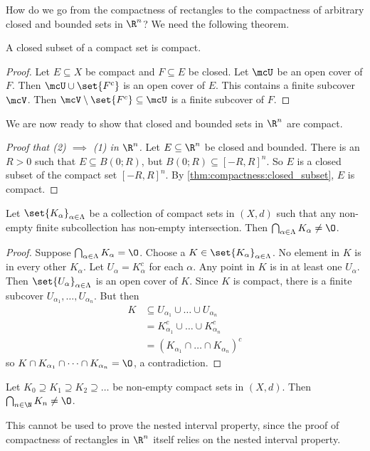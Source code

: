 
How do we go from the compactness of rectangles to the compactness of
arbitrary closed and bounded sets in $\R^n$?
We need the following theorem.
\begin{theorem} \label{thm:compactness:closed_subset}
    A closed subset of a compact set is compact.
\end{theorem}
\begin{proof}
    Let $E \subseteq X$ be compact and $F \subseteq E$ be closed.
    Let $\mcU$ be an open cover of $F$.
    Then $\mcU \cup \set{F^c}$ is an open cover of $E$.
    This contains a finite subcover $\mcV$.
    Then $\mcV \setminus \set{F^c} \subseteq \mcU$ is a finite subcover of $F$.
\end{proof}

We are now ready to show that closed and bounded sets in $\R^n$ are compact.
\begin{proof}[Proof that (2) $\implies$ (1) in $\R^n$]
    Let $E \subseteq \R^n$ be closed and bounded.
    There is an $R > 0$ such that $E \subseteq B(0; R)$, but
    $B(0; R) \subseteq [-R, R]^n$.
    So $E$ is a closed subset of the compact set $[-R, R]^n$.
    By \cref{thm:compactness:closed_subset}, $E$ is compact.
\end{proof}

\begin{theorem} \label{thm:compact:intersection}
    Let $\set{K_\alpha}_{\alpha \in \Lambda}$ be a collection of compact
    sets in $(X, d)$ such that any non-empty finite subcollection has
    non-empty intersection.
    Then $\bigcap_{\alpha \in \Lambda} K_\alpha \neq \O$.
\end{theorem}
\begin{proof}
    Suppose $\bigcap_{\alpha \in \Lambda} K_\alpha = \O$.
    Choose a $K \in \set{K_\alpha}_{\alpha \in \Lambda}$.
    No element in $K$ is in every other $K_\alpha$.
    Let $U_\alpha = K_\alpha^c$ for each $\alpha$.
    Any point in $K$ is in at least one $U_\alpha$.
    Then $\set{U_\alpha}_{\alpha \in \Lambda}$ is an open cover of $K$.
    Since $K$ is compact, there is a finite subcover
    $U_{\alpha_1}, \dots, U_{\alpha_n}$.
    But then \begin{align*}
        K &\subseteq U_{\alpha_1} \cup \dots \cup U_{\alpha_n} \\
          &= K_{\alpha_1}^c \cup \dots \cup K_{\alpha_n}^c \\
          &= (K_{\alpha_1} \cap \dots \cap K_{\alpha_n})^c
    \end{align*}
    so $K \cap K_{\alpha_1} \cap \dots \cap K_{\alpha_n} = \O$, a
    contradiction.
\end{proof}
\begin{corollary}
    Let $K_0 \supseteq K_1 \supseteq K_2 \supseteq \dots$ be non-empty
    compact sets in $(X, d)$.
    Then $\bigcap_{n \in \N} K_n \neq \O$.
\end{corollary}
\begin{remark}
    This cannot be used to prove the nested interval property, since
    the proof of compactness of rectangles in $\R^n$ itself relies on
    the nested interval property.
\end{remark}


